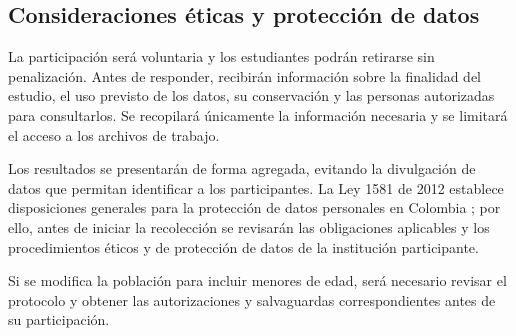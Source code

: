 \subsection{Consideraciones éticas y protección de datos}

La participación será voluntaria y los estudiantes podrán retirarse sin penalización. Antes de responder, recibirán información sobre la finalidad del estudio, el uso previsto de los datos, su conservación y las personas autorizadas para consultarlos. Se recopilará únicamente la información necesaria y se limitará el acceso a los archivos de trabajo.

Los resultados se presentarán de forma agregada, evitando la divulgación de datos que permitan identificar a los participantes. La Ley 1581 de 2012 establece disposiciones generales para la protección de datos personales en Colombia \parencite{colombia2012ley1581}; por ello, antes de iniciar la recolección se revisarán las obligaciones aplicables y los procedimientos éticos y de protección de datos de la institución participante.

Si se modifica la población para incluir menores de edad, será necesario revisar el protocolo y obtener las autorizaciones y salvaguardas correspondientes antes de su participación.
